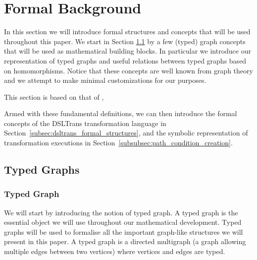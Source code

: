 \section{Formal Background}
\label{sec:formal_background}

In this section we will introduce formal structures and concepts that will be used throughout this paper. We start in Section \ref{subsec:typed_graphs} by a few (typed) graph concepts that will be used as mathematical building blocks. In particular we introduce our representation of typed graphs and useful relations between typed graphs based on homomorphisms. Notice that these concepts are well known from graph theory and we attempt to make minimal customizations for our purposes.

This section is based on that of \cite{Barroca2013},

Armed with these fundamental definitions, we can then introduce the formal concepts of the DSLTrans transformation language in Section~\ref{subsec:dsltrans_formal_structures}, and the symbolic representation of transformation executions in Section~\ref{subsubsec:path_condition_creation}.


\newcommand{\defineggprime}{Let $\langle V,E,(s,t),\tau,VT,ET\rangle = g$, and\\ $\langle V',E',(s',t'),\tau',VT',ET'\rangle = g'$, where $g, g' \in \textsc{TG}$.}

\newcommand{\ET}{\mathit{ET}}
\newcommand{\VT}{\mathit{VT}}



\subsection{Typed Graphs}
\label{subsec:typed_graphs}


\subsubsection*{Typed Graph}
We will start by introducing the notion of typed graph. A typed graph is the essential object we will use throughout our mathematical development. Typed graphs will be used to formalise all the important graph-like structures we will present in this paper. A typed graph is a directed multigraph (a graph allowing multiple edges between two vertices) where vertices and edges are typed.


